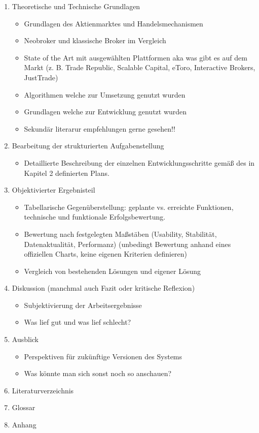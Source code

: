 \documentclass{article}
\begin{document}
\begin{enumerate}
\begin{itemize}
        \item SEHR WICHTIG ÜBERALL DATUM UND VERRSIONIERUNG NOTIEREN!
         \item Beschreibung der eingesetzten Frameworks, Programmiersprachen, APIs und Datenquellen.
    \end{itemize}
    \item Theoretische und Technische Grundlagen
    \begin{itemize}
        \item Grundlagen des Aktienmarktes und Handelsmechanismen
        \item Neobroker und klassische Broker im Vergleich 
        \item State of the Art mit ausgewählten Plattformen aka was gibt es auf dem Markt (z. B. Trade Republic, Scalable Capital, eToro, Interactive Brokers, JustTrade)
        \item Algorithmen welche zur Umsetzung genutzt wurden
        \item Grundlagen welche zur  Entwicklung genutzt wurden
        \item Sekundär literarur empfehlungen gerne gesehen!!
    \end{itemize}
    \item Bearbeitung der strukturierten Aufgabenstellung
     \begin{itemize}
        \item  Detaillierte Beschreibung der einzelnen Entwicklungsschritte gemäß des in Kapitel 2 definierten Plans.
    \end{itemize}
    \item Objektivierter Ergebnisteil
         \begin{itemize}
        \item Tabellarische Gegenüberstellung: geplante vs. erreichte Funktionen, technische und funktionale Erfolgsbewertung.
        \item   Bewertung nach festgelegten Maßstäben (Usability, Stabilität, Datenaktualität, Performanz) (unbedingt Bewertung anhand eines offiziellen Charts, keine eigenen Kriterien definieren)
  \item Vergleich von bestehenden Lösungen und eigener Lösung
    \end{itemize}
    \newpage
    \item Diskussion (manchmal auch Fazit oder kritische Reflexion)
    \begin{itemize}
        \item Subjektivierung der Arbeitsergebnisse
        \item Was lief gut und was lief schlecht?
    \end{itemize}
    \item Ausblick
    \begin{itemize}
        \item Perspektiven für zukünftige Versionen des Systems
        \item Was könnte man sich sonst noch so anschauen?
    \end{itemize}
    \item Literaturverzeichnis
    \item Glossar
    \item Anhang
\end{enumerate}
\end{document}
